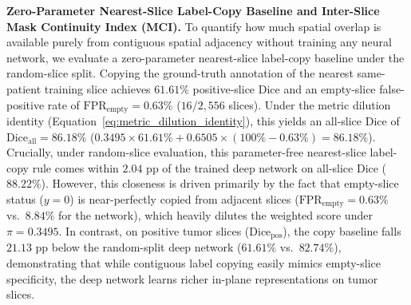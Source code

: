 \documentclass[11pt,a4paper]{article}
\begin{document}
\noindent\textbf{Zero-Parameter Nearest-Slice Label-Copy Baseline and Inter-Slice Mask Continuity Index (MCI).}
To quantify how much spatial overlap is available purely from contiguous spatial adjacency without training any neural network, we evaluate a zero-parameter nearest-slice label-copy baseline under the random-slice split. Copying the ground-truth annotation of the nearest same-patient training slice achieves $61.61\%$ positive-slice Dice and an empty-slice false-positive rate of $\text{FPR}_{\text{empty}} = 0.63\%$ ($16 / 2,556$ slices). Under the metric dilution identity (Equation~\ref{eq:metric_dilution_identity}), this yields an all-slice Dice of $\text{Dice}_{\text{all}} = 86.18\%$ ($0.3495 \times 61.61\% + 0.6505 \times (100\% - 0.63\%) = 86.18\%$). Crucially, under random-slice evaluation, this parameter-free nearest-slice label-copy rule comes within $2.04\text{ pp}$ of the trained deep network on all-slice Dice ($88.22\%$). However, this closeness is driven primarily by the fact that empty-slice status ($y=0$) is near-perfectly copied from adjacent slices ($\text{FPR}_{\text{empty}} = 0.63\%$ vs.\ $8.84\%$ for the network), which heavily dilutes the weighted score under $\pi = 0.3495$. In contrast, on positive tumor slices ($\text{Dice}_{\text{pos}}$), the copy baseline falls $21.13\text{ pp}$ below the random-split deep network ($61.61\%$ vs.\ $82.74\%$), demonstrating that while contiguous label copying easily mimics empty-slice specificity, the deep network learns richer in-plane representations on tumor slices.
\end{document}
